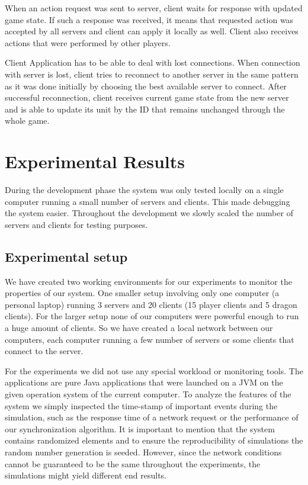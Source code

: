 \documentclass[a4paper]{article}
\begin{document}
When an action request was sent to server, client waits for response with updated game state. If such a response was received, it means that requested action was accepted by all servers and client can apply it locally as well. Client also receives actions that were performed by other players.

Client Application has to be able to deal with lost connections. When connection with server is lost, client tries to reconnect to another server in the same pattern as it was done initially by choosing the best available server to connect. After successful reconnection, client receives current game state from the new server and is able to update its unit by the ID that remains unchanged through the whole game.

\section{Experimental Results}
During the development phase the system was only tested locally on a single computer running a small number of servers and clients. This made debugging the system easier. Throughout the development we slowly scaled the number of servers and clients for testing purposes.

\subsection{Experimental setup}
We have created two working environments for our experiments to monitor the properties of our system. One smaller setup involving only one computer (a personal laptop) running 3 servers and 20 clients (15 player clients and 5 dragon clients). For the larger setup none of our computers were powerful enough to run a huge amount of clients. So we have created a local network between our computers, each computer running a few number of servers or some clients that connect to the server.

For the experiments we did not use any special workload	or monitoring tools. The applications are pure Java applications that were launched on a JVM on the given operation system of the current computer. To analyze the features of the system we simply inspected the time-stamp of important events during the simulation, such as the response time of a network request or the performance of our synchronization algorithm. It is important to mention that the system contains randomized elements and to ensure the reproducibility of simulations the random number generation is seeded. However, since the network conditions cannot be guaranteed to be the same throughout the experiments, the simulations might yield different end results.
\end{document}
